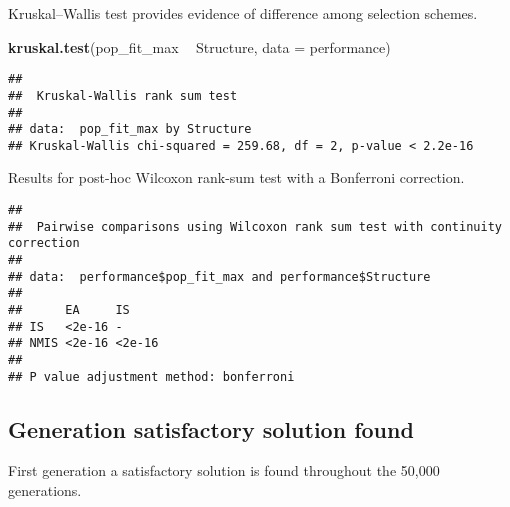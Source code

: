 \documentclass[]{book}
\newenvironment{Shaded}{\begin{snugshade}}{\end{snugshade}}
\newcommand{\DataTypeTok}[1]{\textcolor[rgb]{0.13,0.29,0.53}{#1}}
\newcommand{\KeywordTok}[1]{\textcolor[rgb]{0.13,0.29,0.53}{\textbf{#1}}}
\newcommand{\NormalTok}[1]{#1}
\newcommand{\OperatorTok}[1]{\textcolor[rgb]{0.81,0.36,0.00}{\textbf{#1}}}
\newcommand{\OtherTok}[1]{\textcolor[rgb]{0.56,0.35,0.01}{#1}}
\newcommand{\StringTok}[1]{\textcolor[rgb]{0.31,0.60,0.02}{#1}}
\begin{document}
Kruskal--Wallis test provides evidence of difference among selection schemes.

\begin{Shaded}
\begin{Highlighting}[]
\KeywordTok{kruskal.test}\NormalTok{(pop_fit_max }\OperatorTok{~}\StringTok{ }\NormalTok{Structure, }\DataTypeTok{data =}\NormalTok{ performance)}
\end{Highlighting}
\end{Shaded}

\begin{verbatim}
## 
##  Kruskal-Wallis rank sum test
## 
## data:  pop_fit_max by Structure
## Kruskal-Wallis chi-squared = 259.68, df = 2, p-value < 2.2e-16
\end{verbatim}

Results for post-hoc Wilcoxon rank-sum test with a Bonferroni correction.

\begin{Shaded}
\end{Shaded}

\begin{verbatim}
## 
##  Pairwise comparisons using Wilcoxon rank sum test with continuity correction 
## 
## data:  performance$pop_fit_max and performance$Structure 
## 
##      EA     IS    
## IS   <2e-16 -     
## NMIS <2e-16 <2e-16
## 
## P value adjustment method: bonferroni
\end{verbatim}

\hypertarget{generation-satisfactory-solution-found-13}{%
\subsection{Generation satisfactory solution found}\label{generation-satisfactory-solution-found-13}}

First generation a satisfactory solution is found throughout the 50,000 generations.
\end{document}
